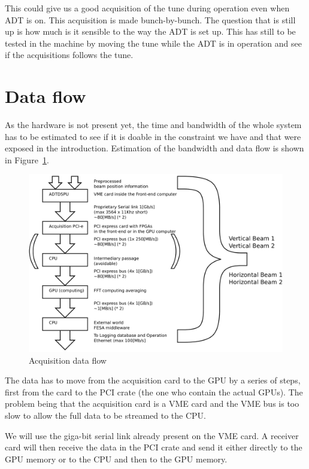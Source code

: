 This could give us a good acquisition of the \gls{tune} during operation even when \gls{ADT} is on. This acquisition is made bunch-by-bunch. The question that is still up is how much is it sensible to the way the \gls{ADT} is set up. This has still to be tested in the machine by moving the tune while the \gls{ADT} is in operation and see if the acquisitions follows the tune.

\section{Data flow}

As the hardware is not present yet, the time and bandwidth of the whole system has to be estimated to see if it is doable in the constraint we have and that were exposed in the introduction. Estimation of the bandwidth and data flow is shown in Figure~\ref{fig:data_flow}.

\begin{figure}[H]
\caption{Acquisition data flow}
\label{fig:data_flow}
\centering
\includegraphics[scale=0.3]{dataflow.pdf}
\end{figure}

The data has to move from the acquisition card to the GPU by a series of steps, first from the card to the PCI crate (the one who contain the actual \glspl{GPU}). The problem being that the acquisition card is a \gls{VME} card and the VME bus is too slow to allow the full data to be streamed to the \gls{CPU}. 

We will use the giga-bit serial link already present on the VME
card. A receiver card will then receive the data in the PCI crate and
send it either directly to the \gls{GPU} memory or to the \gls{CPU}
and then to the \gls{GPU} memory.

